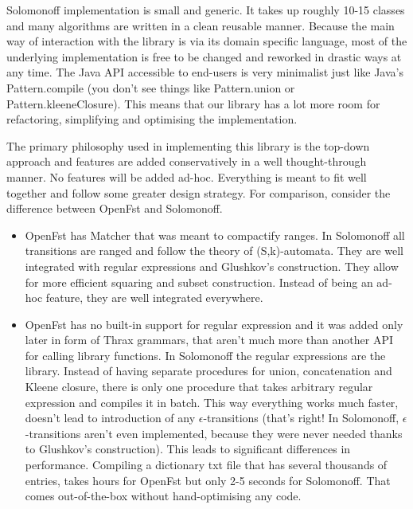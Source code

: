 \documentclass[oneside,polski,logo]{amuthesis}
\begin{document}
\begin{streszczenie}
Solomonoff implementation is small and generic. It takes up roughly 10-15 classes and many algorithms are written in a clean reusable manner. Because the main way of interaction with the library is via its domain specific language, most of the underlying implementation is free to be changed and reworked in drastic ways at any time. The Java API accessible to end-users is very minimalist just like Java's Pattern.compile (you don't see things like Pattern.union or Pattern.kleeneClosure). This means that our library has a lot more room for refactoring, simplifying and optimising the implementation.

The primary philosophy used in implementing this library is the top-down approach and features are added conservatively in a well thought-through manner. No features will be added ad-hoc. Everything is meant to fit well together and follow some greater design strategy. For comparison, consider the difference between OpenFst and Solomonoff.

\begin{itemize}
	\item OpenFst has Matcher that was meant to compactify ranges. In Solomonoff all transitions are ranged and follow the theory of (S,k)-automata. They are well integrated with regular expressions and Glushkov's construction. They allow for more efficient squaring and subset construction. Instead of being an ad-hoc feature, they are well integrated everywhere.
	
	\item OpenFst has no built-in support for regular expression and it was added only later in form of Thrax grammars, that aren't much more than another API for calling library functions. In Solomonoff the regular expressions are the library. Instead of having separate procedures for union, concatenation and Kleene closure, there is only one procedure that takes arbitrary regular expression and compiles it in batch. This way everything works much faster, doesn't lead to introduction of any $\epsilon$-transitions (that's right! In Solomonoff, $\epsilon$-transitions aren't even implemented, because they were never needed thanks to Glushkov's construction). This leads to significant differences in performance. Compiling a dictionary txt file that has several thousands of entries, takes hours for OpenFst but only 2-5 seconds for Solomonoff. That comes out-of-the-box without hand-optimising any code.
	
\end{itemize}



\end{streszczenie}
\end{document}
